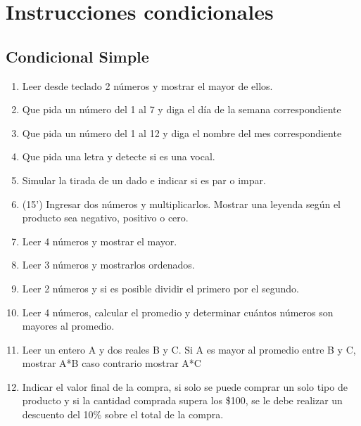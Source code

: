 \chapter{Instrucciones condicionales}

\section{Condicional Simple}

 \begin{enumerate}[resume]
  
	\item Leer desde teclado 2 números y mostrar el mayor de ellos.
  
	\item Que pida un número del 1 al 7 y diga el día de la semana correspondiente
  
	\item Que pida un número del 1 al 12 y diga el nombre del mes correspondiente
   
	\item Que pida una letra y detecte si es una vocal.
    
    \item Simular la tirada de un dado e indicar si es par o impar.
    
	\item (15’) Ingresar dos números y multiplicarlos. Mostrar una leyenda según el producto sea negativo, positivo o cero.
    
   \item Leer 4 números y mostrar el mayor.
   
   \item Leer 3 números y mostrarlos ordenados.
     
   \item Leer 2 números y si es posible dividir el primero por el segundo.
    
   \item Leer 4 números, calcular el promedio y determinar cuántos números son mayores al promedio.
    
   \item Leer un entero A y dos reales B y C. Si A es mayor al promedio entre B y C, mostrar A*B caso contrario mostrar A*C
    
   \item Indicar el valor final de la compra, si solo se puede comprar un solo tipo de producto y si la cantidad comprada supera los \$100, se le debe realizar un descuento del 10\%  sobre el total de la compra.    
    

\end{enumerate}
